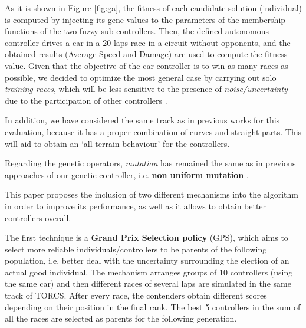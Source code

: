 \documentclass[10pt,journal,compsoc]{IEEEtran}
\begin{document}
As it is shown in Figure \ref{fig:ga}, the fitness of each candidate solution (individual) is computed by injecting its gene values to the parameters of the membership functions of the two fuzzy sub-controllers. Then, the defined autonomous controller drives a car in a 20 laps race in a circuit without opponents, and the obtained results (Average Speed and Damage) are used to compute the fitness value. 
Given that the objective of the car controller is to win as many races as
possible, we decided to optimize the most general case by carrying out solo {\em training races}, which will be less sensitive to the presence of \textit{noise/uncertainty} due to the participation of other controllers \cite{merelo2016statistical}.

In addition, we have considered the same track as in previous works \cite{salem_cig2018} for this evaluation, because it has a proper combination of curves and straight parts. This will aid to obtain an `all-terrain behaviour' for the controllers.

Regarding the genetic operators, \textit{mutation} has remained the same as in previous approaches of our genetic controller, i.e. \textbf{non uniform mutation} \cite{mutation1997}. 






This paper proposes the inclusion of two different mechanisms into the algorithm in order to improve its performance, as well as it allows to obtain better controllers overall.

The first technique is a \textbf{Grand Prix Selection policy} (GPS), which aims to select more reliable individuals/controllers to be parents of the following population, i.e. better deal with the uncertainty surrounding the election of an actual good individual. The mechanism arranges groups of 10 controllers (using the same car) and then different races of several laps are simulated in the same track of TORCS. After every race, the contenders obtain different scores depending on their position in the final rank. The best 5 controllers in the sum of all the races are selected as parents for the following generation. 
\end{document}
